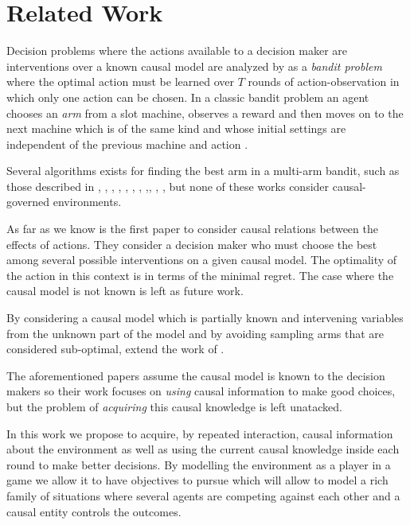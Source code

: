 \documentclass{article}
\begin{document}
\section{Related Work}
Decision problems where the actions available to a decision maker are interventions over a known causal model are analyzed by \cite{lattimoreNIPS2016} as a \textit{bandit problem} where the optimal action must be learned over $T$ rounds of action-observation in which only one action can be chosen. In a classic bandit problem an agent chooses an \textit{arm} from a slot machine, observes a reward and then moves on to the next machine which is of the same kind and whose initial settings are independent of the previous machine and action \cite{sutton1998reinforcement}.

Several algorithms exists for finding the best arm in a multi-arm bandit, such as those described in \cite{bubeck2009pure}, \cite{audibert2010best}, \cite{gabillon2012best}, \cite{agarwal2014taming} , \cite{jamieson2014lil},  \cite{jamieson2014best},  \cite{ortega2014generalized}, \cite{chen2015optimal},\cite{carpentier2016tight},  \cite{russo2016simple},  \cite{kaufmann2016complexity}, but none of these works consider causal-governed environments.

As far as we know \cite{lattimoreNIPS2016} is the first paper to consider causal relations between the effects of actions. They consider a decision maker who must choose the best among several possible interventions on a given causal model. The optimality of the action in this context is in terms of the minimal regret. The case where the causal model is not known is left as future work.

By considering a causal model which is partially known and intervening variables from the unknown part of the model and by avoiding sampling arms that are considered sub-optimal, \cite{sen2017identifying} extend the work of \cite{lattimoreNIPS2016}.

The aforementioned papers assume the causal model is known to the decision makers so their work focuses on \textit{using} causal information to make good choices, but the problem of \textit{acquiring} this causal knowledge is left unatacked.

In this work we propose to acquire, by repeated interaction, causal information about the environment as well as using the current causal knowledge inside each round to make better decisions. By modelling the environment as a player in a game we allow it to have objectives to pursue which will allow to model a rich family of situations where several agents are competing against each other and a causal entity controls the outcomes. 
\end{document}
